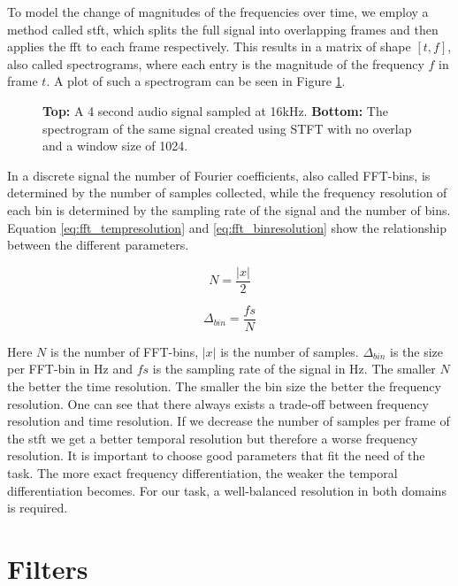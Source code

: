 To model the change of magnitudes of the frequencies over time, we employ a method called \gls{stft}, which splits the full signal into overlapping frames and then applies the \gls{fft} to each frame respectively. This results in a matrix of shape $[t, f]$, also called spectrograms, where each entry is the magnitude of the frequency $f$ in frame $t$. A plot of such a spectrogram can be seen in Figure \ref{fig:spectrogram}.

\begin{figure}[htbp]
    
    \centering
    \caption[Spectrogram example]{\textbf{Top:} A 4 second audio signal sampled at 16kHz. \textbf{Bottom:} The spectrogram of the same signal created using STFT with no overlap and a window size of 1024.}
    \label{fig:spectrogram}
\end{figure}

In a discrete signal the number of Fourier coefficients, also called FFT-bins, is determined by the number of samples collected, while the frequency resolution of each bin is determined by the sampling rate of the signal and the number of bins. Equation \ref{eq:fft_tempresolution} and \ref{eq:fft_binresolution} show the relationship between the different parameters.

\begin{equation}\label{eq:fft_tempresolution}
    N = \frac{|x|}{2}
\end{equation}

\begin{equation}\label{eq:fft_binresolution}
    \Delta_{bin} = \frac{fs}{N}
\end{equation}

Here $N$ is the number of FFT-bins, $|x|$ is the number of samples. $\Delta_{bin}$ is the size per FFT-bin in Hz and $fs$ is the sampling rate of the signal in Hz. The smaller $N$ the better the time resolution. The smaller the bin size the better the frequency resolution. One can see that there always exists a trade-off between frequency resolution and time resolution. If we decrease the number of samples per frame of the \gls{stft} we get a better temporal resolution but therefore a worse frequency resolution. It is important to choose good parameters that fit the need of the task. The more exact frequency differentiation, the weaker the temporal differentiation becomes. For our task, a well-balanced resolution in both domains is required.

\section{Filters}

